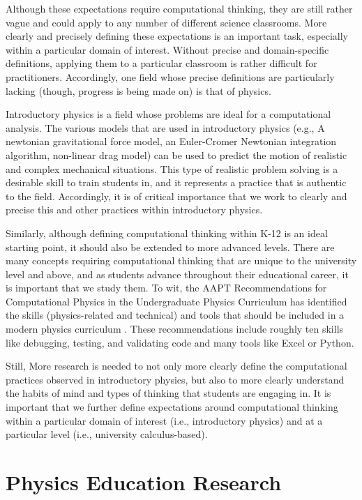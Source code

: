 \documentclass{msuphddissertation}
\begin{document}
\begin{doublespace}
Although these expectations require computational thinking, they are still rather vague and could apply to any number of different science classrooms.  More clearly and precisely defining these expectations is an important task, especially within a particular domain of interest.  Without precise and domain-specific definitions, applying them to a particular classroom is rather difficult for practitioners.  Accordingly, one field whose precise definitions are particularly lacking (though, progress is being made on) is that of physics.

Introductory physics is a field whose problems are ideal for a computational analysis.  The various models that are used in introductory physics (e.g., A newtonian gravitational force model, an Euler-Cromer Newtonian integration algorithm, non-linear drag model) can be used to predict the motion of realistic and complex mechanical situations.  This type of realistic problem solving is a desirable skill to train students in, and it represents a practice that is authentic to the field.  Accordingly, it is of critical importance that we work to clearly and precise this and other practices within introductory physics.

Similarly, although defining computational thinking within K-12 is an ideal starting point, it should also be extended to more advanced levels.  There are many concepts requiring computational thinking that are unique to the university level and above, and as students advance throughout their educational career, it is important that we study them.  To wit, the AAPT Recommendations for Computational Physics in the Undergraduate Physics Curriculum has identified the skills (physics-related and technical) and tools that should be included in a modern physics curriculum \cite{AAPT2016}.  These recommendations include roughly ten skills like debugging, testing, and validating code and many tools like Excel or Python.

Still, More research is needed to not only more clearly define the computational practices observed in introductory physics, but also to more clearly understand the habits of mind and types of thinking that students are engaging in.  It is important that we further define expectations around computational thinking within a particular domain of interest (i.e., introductory physics) and at a particular level (i.e., university calculus-based).

\section{Physics Education Research}


\end{doublespace}
\end{document}
